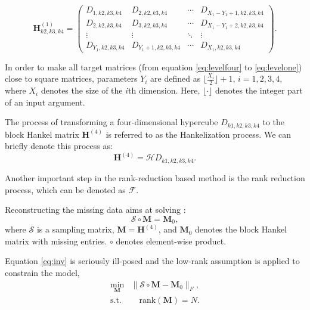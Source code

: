 \begin{equation}
\label{eq:levelone}
\mathbf{H}_{k2,k3,k4}^{(1)}=\left(\begin{array}{cccc}
D_{1,k2,k3,k4} & D_{2,k2,k3,k4} & \cdots &D_{X_1-Y_1+1,k2,k3,k4} \\
D_{2,k2,k3,k4} & D_{3,k2,k3,k4}  &\cdots &D_{X_1-Y_1+2,k2,k3,k4} \\
\vdots & \vdots &\ddots &\vdots \\
D_{Y_1,k2,k3,k4}&D_{Y_1+1,k2,k3,k4} &\cdots&D_{X_1,k2,k3,k4}
\end{array}
\right).
\end{equation}

In order to make all target matrices (from equation \ref{eq:levelfour} to \ref{eq:levelone}) close to square matrices, parameters $Y_i$ are defined as $\lfloor \frac{X_i}{2} \rfloor +1$, $i=1,2,3,4$, where $X_i$ denotes the size of the $i$th dimension. Here, $\lfloor\cdot\rfloor$ denotes the integer part of an input argument.

The process of transforming a four-dimensional hypercube $D_{k1,k2,k3,k4}$ to the block Hankel matrix $\mathbf{H}^{(4)}$ is referred to as the Hankelization process. We can briefly denote this process as: 
\begin{equation}
\label{eq:hankel}
\mathbf{H}^{(4)}=\mathcal{H}D_{k1,k2,k3,k4}.
\end{equation}

Another important step in the rank-reduction based method is the rank reduction process, which can be denoted as $\mathcal{F}$. 

Reconstructing the missing data aims at solving :
\begin{equation}
\label{eq:inv}
\mathcal{S} \circ \mathbf{M} = \mathbf{M}_{0},
\end{equation}
where $\mathcal{S}$ is a sampling matrix, $\mathbf{M}=\mathbf{H}^{(4)}$, and $\mathbf{M}_{0}$ denotes the block Hankel
matrix with missing entries. $\circ$ denotes element-wise product.

Equation \ref{eq:inv} is seriously ill-posed and the low-rank assumption is applied to constrain the model,
\begin{equation}
\label{eq:inv2}
\begin{split}
\min_{\mathbf{M}} &\parallel \mathcal{S} \circ \mathbf{M}-\mathbf{M}_{0}\parallel_F, \\
\text{s.t.}&\quad \text{rank}(\mathbf{M})=N.
\end{split}
\end{equation}


